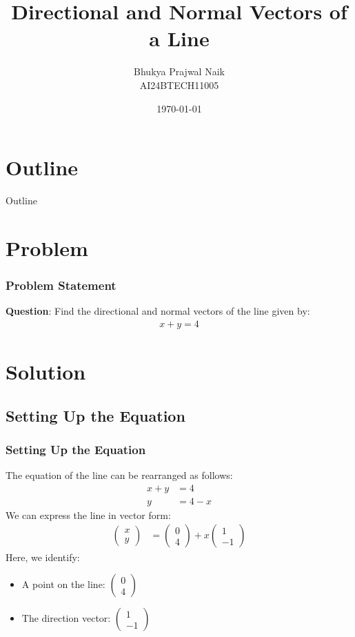 \documentclass{beamer}
\title{Directional and Normal Vectors of a Line}
\author{Bhukya Prajwal Naik \\ AI24BTECH11005}
\date{\today}
\newcommand{\myvec}[1]{\begin{pmatrix}#1\end{pmatrix}}
\begin{document}
\begin{frame}
  \titlepage
\end{frame}

\section*{Outline}
\begin{frame}{Outline}
  \tableofcontents
\end{frame}

\section{Problem}
\begin{frame}
  \frametitle{Problem Statement}
  \textbf{Question}: Find the directional and normal vectors of the line given by:
  \begin{align}
    x + y = 4
  \end{align}
\end{frame}

\section{Solution}
\subsection{Setting Up the Equation}
\begin{frame}
  \frametitle{Setting Up the Equation}
  The equation of the line can be rearranged as follows:
  \begin{align}
    x + y &= 4 \\
    y &= 4 - x
  \end{align}
  We can express the line in vector form:
  \begin{align}
   \myvec{x \\ y} &= \myvec{0 \\ 4} + x \myvec{1 \\ -1}
  \end{align}
  Here, we identify:
  \begin{itemize}
    \item A point on the line: \( \myvec{0 \\ 4} \)
    \item The direction vector: \( \myvec{1 \\ -1} \)
  \end{itemize}
\end{frame}
\end{document}
